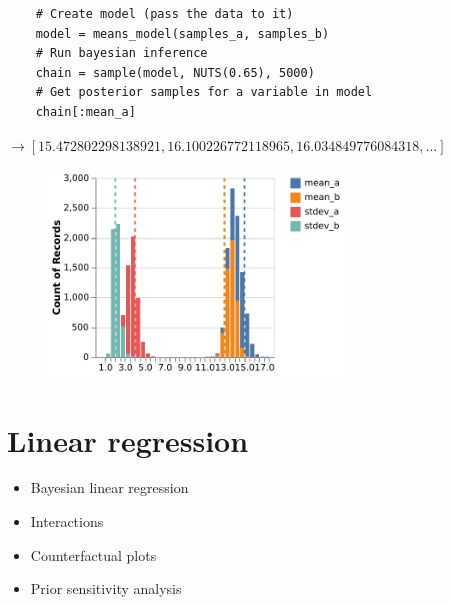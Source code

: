 \documentclass[aspectratio=169,xcolor=svgnames]{beamer}
\begin{document}
\begin{frame}[fragile]
  \begin{verbatim}
    # Create model (pass the data to it)
    model = means_model(samples_a, samples_b)
    # Run bayesian inference
    chain = sample(model, NUTS(0.65), 5000)
    # Get posterior samples for a variable in model
    chain[:mean_a]
  \end{verbatim}

  $\rightarrow [15.472802298138921, 16.100226772118965, 16.034849776084318, \dots]$
\end{frame}

\begin{frame}
  \begin{figure}[ht]
    \centering
    \includegraphics[width=0.7\textwidth]{figures/plot_a_b_parameters.pdf}
  \end{figure}

\end{frame}

\section{Linear regression}

\begin{frame}
  \begin{itemize}
  \item Bayesian linear regression
  \item Interactions
  \item Counterfactual plots
  \item Prior sensitivity analysis
  \end{itemize}
\end{frame}
\end{document}
